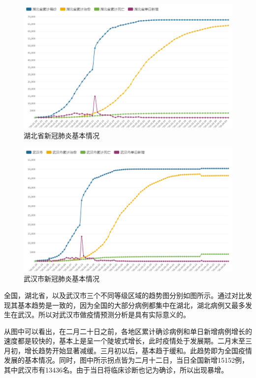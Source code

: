 \documentclass[12pt,hyperref,]{ctexart}
\begin{document}
\begin{figure}
\includegraphics[width=5.56in]{image/3.1.2} \caption{湖北省新冠肺炎基本情况}\label{fig:3.2}
\end{figure}

\begin{figure}
\includegraphics[width=5.56in]{image/3.1.3} \caption{武汉市新冠肺炎基本情况}\label{fig:3.3}
\end{figure}

全国，湖北省，以及武汉市三个不同等级区域的趋势图分别如图所示。通过对比发现其基本趋势是一致的，因为全国的大部分病例都集中在湖北，湖北病例又最多发生在武汉。所以对武汉市做疫情预测分析是具有实际意义的。

从图中可以看出，在二月二十日之前，各地区累计确诊病例和单日新增病例增长的速度都是较快的，基本上是呈一个陡坡式增长，此时疫情处于发展期。二月末至三月初，增长趋势开始显著减缓。三月初以后，基本趋于缓和。此趋势即为全国疫情发展的基本情况。同时，图中所示拐点皆为二月十二日，当日全国新增15152例，其中武汉市有13436名。由于当日将临床诊断也记为确诊，所以出现暴增。
\end{document}
